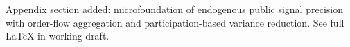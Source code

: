 Appendix section added: microfoundation of endogenous public signal precision with order-flow aggregation and participation-based variance reduction. See full LaTeX in working draft.